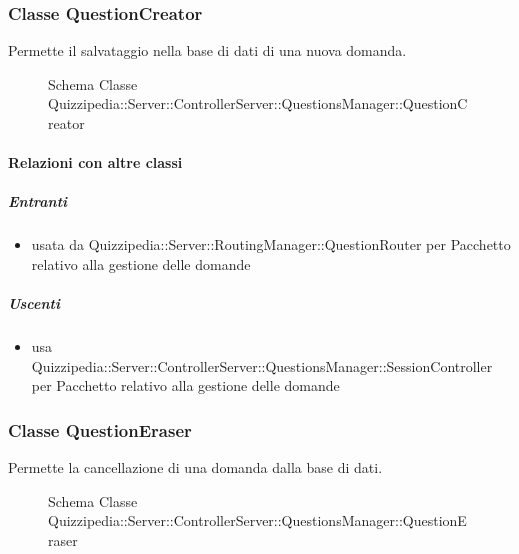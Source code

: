 \subsubsection{Classe QuestionCreator}
Permette il salvataggio nella base di dati di una nuova domanda.
\begin{figure}[H]
\centering
\noindent{}
\caption[Schema Classe QuestionCreator]{Schema Classe Quizzipedia::Server::ControllerServer::QuestionsManager::QuestionCreator}
\end{figure}
\paragraph{Relazioni con altre classi}
\subparagraph{Entranti}
\begin{itemize}
\item usata da Quizzipedia::Server::RoutingManager::QuestionRouter per Pacchetto relativo alla gestione delle domande
\end{itemize}
\subparagraph{Uscenti}
\begin{itemize}
\item usa Quizzipedia::Server::ControllerServer::QuestionsManager::SessionController per Pacchetto relativo alla gestione delle domande
\end{itemize}
\subsubsection{Classe QuestionEraser}
Permette la cancellazione di una domanda dalla base di dati.
\begin{figure}[H]
\centering
\noindent{}
\caption[Schema Classe QuestionEraser]{Schema Classe Quizzipedia::Server::ControllerServer::QuestionsManager::QuestionEraser}
\end{figure}
